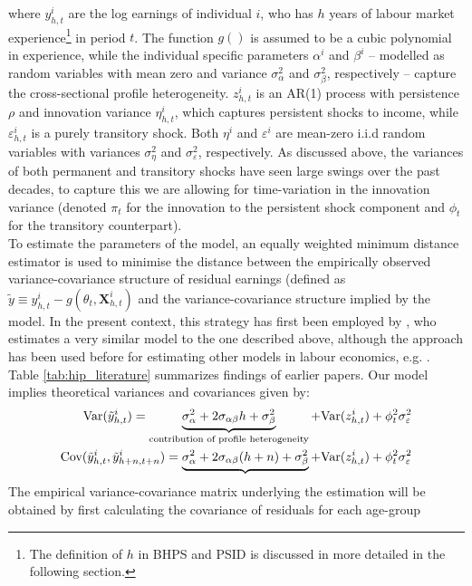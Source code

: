 where $y_{h,t}^i$ are the log earnings of individual $i$, who has $h$ years of
labour market experience\footnote{The definition of $h$ in BHPS and PSID is 
discussed in more detailed in the following section.}
 in period $t$. The function $g()$ is assumed to be
a cubic polynomial in experience, while the individual specific parameters
$\alpha^i$ and $\beta^i$ -- modelled as random variables with mean zero and
variance $\sigma^2_{\alpha}$ and $\sigma^2_{\beta}$, respectively --
 capture the cross-sectional profile heterogeneity.
$z_{h,t}^i$ is an AR(1) process with persistence $\rho$ and innovation variance
$\eta_{h,t}^i$, which captures persistent shocks to income, while
$\varepsilon_{h,t}^i$ is a purely transitory shock. Both $\eta^i$ and
$\varepsilon^i$ are mean-zero i.i.d random variables with variances
$\sigma^2_{\eta}$ and $\sigma^2_{\varepsilon}$, respectively. As discussed
above, the variances of both permanent and transitory shocks have seen large
swings over the past decades, to capture this we are allowing for time-variation
in the innovation variance (denoted $\pi_t$ for the innovation to the persistent
shock component and $\phi_t$ for the transitory counterpart). \\
To estimate the parameters of the model, an equally weighted minimum distance
estimator is used to minimise the distance between the empirically observed
variance-covariance structure of residual earnings (defined as $\tilde{y} \equiv
y_{h,t}^i - g(\theta_t, \pmb{X}_{h,t}^i)$ and the variance-covariance
structure implied by the model. In the present context, this strategy has first
been employed by \citet{Baker1997}, who estimates a very similar model to the one
 described above, although the approach has been used before for estimating
other models in labour economics, e.g. \citet{AbowdCard89}. Table 
\ref{tab:hip_literature} summarizes findings of earlier papers. Our model implies
theoretical variances and covariances given by:
\begin{align}
\mbox{Var}(\tilde{y}_{h,t}^i) = \underbrace{\sigma^2_{\alpha} + 2 \sigma_{\alpha \beta} h + \sigma^2_{\beta}}_{\text{contribution of profile heterogeneity}} + \mbox{Var}(z^i_{h,t}) + \phi_t^2 \sigma^2_{\varepsilon} \\
\mbox{Cov}(\tilde{y}_{h,t}^i, \tilde{y}_{h+n,t+n}^i) = \underbrace{\sigma^2_{\alpha} + 2 \sigma_{\alpha \beta} (h+n) + \sigma^2_{\beta}} + \mbox{Var}(z^i_{h,t}) + \phi_t^2 \sigma^2_{\varepsilon}
\end{align}
The empirical variance-covariance matrix underlying the estimation will be
obtained by first calculating the covariance of residuals for each age-group
